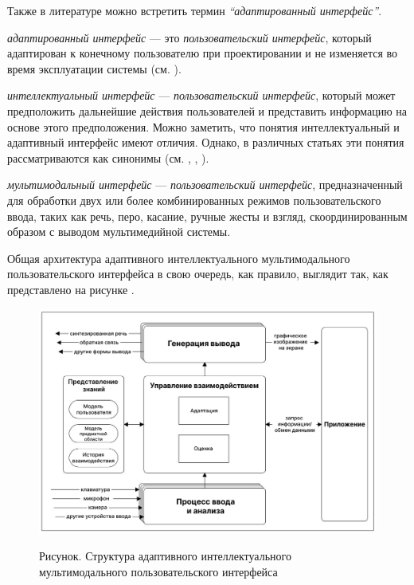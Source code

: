 Также в литературе можно встретить термин \textit{``адаптированный интерфейс''}. 

\textit{адаптированный интерфейс} --- это \textit{пользовательский интерфейс}, который адаптирован к конечному пользователю при проектировании и не изменяется во время эксплуатации системы (см. ).

\textit{интеллектуальный интерфейс} --- \textit{пользовательский интерфейс}, который может предположить дальнейшие действия пользователей и представить информацию на основе этого предположения. Можно заметить, что понятия интеллектуальный и адаптивный интерфейс имеют отличия. Однако, в различных статьях эти понятия рассматриваются как синонимы (см. , , ).

\textit{мультимодальный интерфейс} --- \textit{пользовательский интерфейс}, предназначенный для обработки двух или более комбинированных режимов пользовательского ввода, таких как речь, перо, касание, ручные жесты и взгляд, скоординированным образом с выводом мультимедийной системы.

Общая архитектура адаптивного интеллектуального мультимодального пользовательского интерфейса в свою очередь, как правило, выглядит так, как представлено на рисунке \textit{}.

\begin{figure}[H]
	\caption{Рисунок. Структура адаптивного интеллектуального мультимодального пользовательского интерфейса}
	\includegraphics[scale=0.4]{author/part4/figures/adaptive_ui.png}
	\label{fig:adaptive_ui}
\end{figure}


